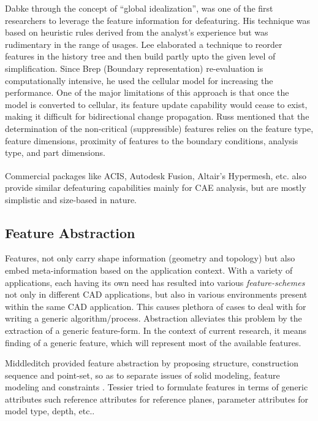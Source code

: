 Dabke \cite{Dabke1994} through the concept of ``global idealization'', was one of the first researchers to leverage the feature information for defeaturing. His technique was based on heuristic rules derived from the analyst's experience but was rudimentary in the range of usages. Lee \cite{Lee2005, SangHunLee2005, Lee2009} elaborated a technique to reorder features in the history tree and then build partly upto the given level of simplification. Since Brep (Boundary representation) re-evaluation is computationally intensive, he used the cellular model for increasing the performance. One of the major limitations of this approach is that once the model is converted to cellular, its feature update capability would cease to exist, making it difficult for bidirectional change propagation. Russ \cite{Russ2012} mentioned that the determination of the non-critical (suppressible) features relies on the feature type, feature dimensions, proximity of features to the boundary conditions, analysis type, and part dimensions.

	Commercial packages like ACIS\textsuperscript{\textregistered}, Autodesk Fusion\textsuperscript{\textregistered}, Altair's Hypermesh\textsuperscript{\textregistered}, etc. also provide similar defeaturing capabilities mainly for CAE analysis, but are mostly simplistic and size-based in nature.
	
\subsection{Feature Abstraction}
Features, not only carry shape information (geometry and topology) but also embed meta-information based on the application context. With a variety of applications, each having its own need  has resulted into various {\em feature-schemes} not only in different CAD applications, but also in various environments present within the same CAD application.  This causes plethora of cases to deal with for writing a generic algorithm/process. Abstraction alleviates this problem by the extraction of a generic feature-form.  In the context of current research, it means finding of a generic feature, which will represent most of the available features.
 
  Middleditch  provided feature abstraction by proposing structure, construction sequence and point-set, so as to separate issues of  solid modeling, feature modeling and constraints \cite{Middleditch1997}.  Tessier tried to formulate features in terms of generic attributes such reference attributes for reference planes, parameter attributes for model type, depth, etc.\cite{Tessier2013}. 
  
